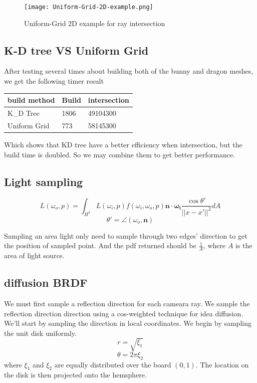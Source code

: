 \documentclass[acmtog]{acmart}
\begin{document}
	\begin{figure}[h]
		\centering
		\texttt{[image: Uniform-Grid-2D-example.png]}
		\caption{Uniform-Grid 2D example for ray intersection}
	\end{figure}

	\subsection{K-D tree VS Uniform Grid}

	After testing several times about building both of the bunny and dragon meshes, we get the following timer result

	\begin{table}[h]
		\begin{tabular}{|l|l|l|}
			\hline
			build method & Build & intersection \\ \hline
			K\_D Tree    & 1806  & 49104300     \\ \hline
			Uniform Grid & 773   & 58145300     \\ \hline
		\end{tabular}
	\end{table}

	Which shows that KD tree have a better efficiency when intersection, but the build time is doubled. So we may combine them to get better performance.

	\subsection{Light sampling}


	\[
		L(\omega_o,p) = \int _{H^2}L(\omega_i, p)f(\omega_i,\omega_o,p)\mathbf{n}\cdot\mathbf{\omega_i}\frac{\cos \theta '}{||x - x'||^2}dA
	\]
	\[
		\theta' = \angle (\omega_o, \mathbf{n})
	\]

	Sampling an area light only need to sample through two edges’ direction to get the position of sampled point.
	And the pdf returned should be $\frac{1}{A}$, where $A$ is the area of light source.


	\subsection{diffusion BRDF}
	We must first sample a reflection direction for each cameara ray. We sample the reflection direction direction using a cos-weighted technique for idea diffusion. We'll start by sampling the direction in local coordinates. We begin by sampling the unit disk uniformly.
	\[r = \sqrt{\xi_1}\]
	\[\theta = 2\pi \xi_2\]
	where $\xi_1$ and $\xi_2$ are equally distributed over the board $(0,1)$. The location on the disk is then projected onto the hemsphere.
\end{document}

